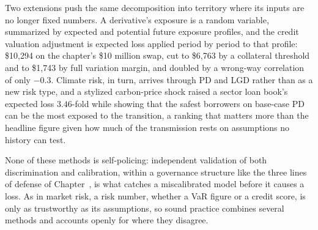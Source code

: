 \documentclass[../ai_in_finance]{subfiles}
\begin{document}
Two extensions push the same decomposition into territory where its inputs are no longer fixed numbers. A derivative's exposure is a random variable, summarized by expected and potential future exposure profiles, and the credit valuation adjustment is expected loss applied period by period to that profile: \$10{,}294 on the chapter's \$10 million swap, cut to \$6{,}763 by a collateral threshold and to \$1{,}743 by full variation margin, and doubled by a wrong-way correlation of only $-0.3$. Climate risk, in turn, arrives through PD and LGD rather than as a new risk type, and a stylized carbon-price shock raised a sector loan book's expected loss $3.46$-fold while showing that the safest borrowers on base-case PD can be the most exposed to the transition, a ranking that matters more than the headline figure given how much of the transmission rests on assumptions no history can test.

None of these methods is self-policing: independent validation of both discrimination and calibration, within a governance structure like the three lines of defense of Chapter~, is what catches a miscalibrated model before it causes a loss. As in market risk, a risk number, whether a VaR figure or a credit score, is only as trustworthy as its assumptions, so sound practice combines several methods and accounts openly for where they disagree.

\end{document}
